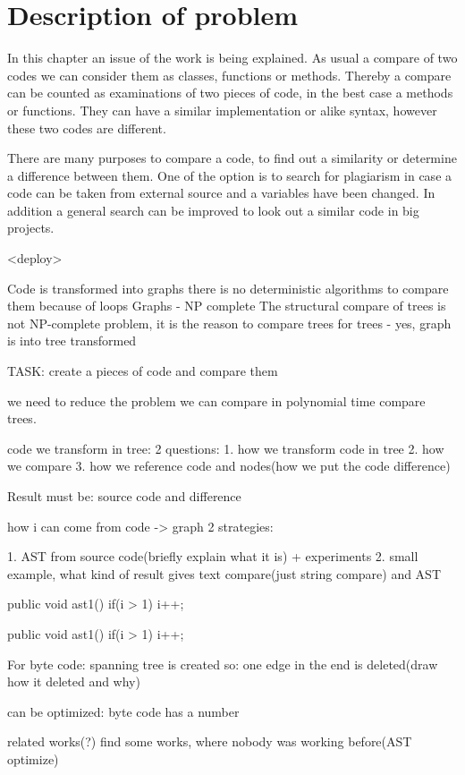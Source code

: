 \chapter{Description of problem}
\label{cha:Description}

In this chapter an issue of the work is being explained. As usual a compare of two codes we can consider them as classes, functions or methods. Thereby a compare can be counted as examinations of two pieces of code, in the best case a methods or functions. They can have a similar implementation or alike syntax, however these two codes are different.

There are many purposes to compare a code, to find out a similarity or determine a difference between them. One of the option is to search for plagiarism in case a code can be taken from external source and a variables have been changed. In addition a general search can be improved to look out a similar code in big projects.

<deploy>

Code is transformed into graphs
there is no deterministic algorithms to compare them because of loops
Graphs - NP complete
The structural compare of trees is not NP-complete problem, it is the reason to compare trees
for trees - yes, graph is into tree transformed

TASK: create a pieces of code and compare them



we need to reduce the problem
we can compare in polynomial time compare trees.

code we transform in tree:
2 questions:
 1. how we transform code in tree
 2. how we compare
 3. how we reference code and nodes(how we put the code difference)
 
Result must be: source code and difference
 
how i can come from code -> graph
2 strategies:

1. AST from source code(briefly explain what it is)	+ experiments
2. 
small example, what kind of result gives text compare(just string compare) and AST

 public void ast1(){
		if(i > 1) i++;
	}
	
	public void ast1(){
		if(i > 1) 
		i++;
	}
	
For byte code:
spanning tree is created so: one edge in the end is deleted(draw how it deleted and why)

can be optimized: byte code has a number

related works(?)
find some works, where nobody was working before(AST optimize)

